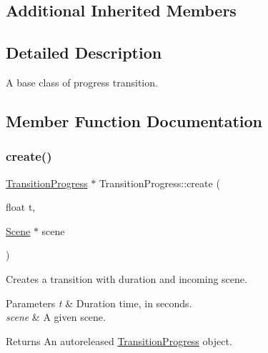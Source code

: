 \subsection*{Additional Inherited Members}


\subsection{Detailed Description}
A base class of progress transition. 

\subsection{Member Function Documentation}
\mbox{\label{classTransitionProgress_ade047171446ee0abbdc022522f84d2ff}} 
\subsubsection{\texorpdfstring{create()}{create()}\hspace{0.1cm}{\footnotesize\ttfamily [1/2]}}
{\footnotesize\ttfamily \hyperlink{classTransitionProgress}{Transition\+Progress} $\ast$ Transition\+Progress\+::create (\begin{DoxyParamCaption}\item[{float}]{t,  }\item[{\hyperlink{classScene}{Scene} $\ast$}]{scene }\end{DoxyParamCaption})\hspace{0.3cm}{\ttfamily [static]}}

Creates a transition with duration and incoming scene.


\begin{DoxyParams}{Parameters}
{\em t} & Duration time, in seconds. \\
\hline
{\em scene} & A given scene. \\
\hline
\end{DoxyParams}
\begin{DoxyReturn}{Returns}
An autoreleased \hyperlink{classTransitionProgress}{Transition\+Progress} object. 
\end{DoxyReturn}
\mbox{\label{classTransitionProgress_ad88fb0bc6247c6e96f5b0e1fb08bc505}} 
